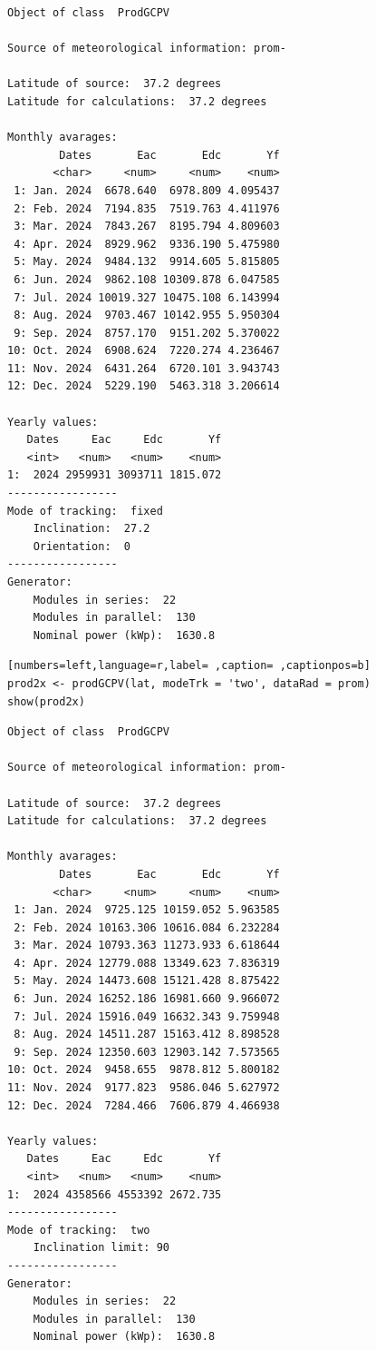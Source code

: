 \begin{verbatim}
Object of class  ProdGCPV 

Source of meteorological information: prom- 

Latitude of source:  37.2 degrees
Latitude for calculations:  37.2 degrees

Monthly avarages:
        Dates       Eac       Edc       Yf
       <char>     <num>     <num>    <num>
 1: Jan. 2024  6678.640  6978.809 4.095437
 2: Feb. 2024  7194.835  7519.763 4.411976
 3: Mar. 2024  7843.267  8195.794 4.809603
 4: Apr. 2024  8929.962  9336.190 5.475980
 5: May. 2024  9484.132  9914.605 5.815805
 6: Jun. 2024  9862.108 10309.878 6.047585
 7: Jul. 2024 10019.327 10475.108 6.143994
 8: Aug. 2024  9703.467 10142.955 5.950304
 9: Sep. 2024  8757.170  9151.202 5.370022
10: Oct. 2024  6908.624  7220.274 4.236467
11: Nov. 2024  6431.264  6720.101 3.943743
12: Dec. 2024  5229.190  5463.318 3.206614

Yearly values:
   Dates     Eac     Edc       Yf
   <int>   <num>   <num>    <num>
1:  2024 2959931 3093711 1815.072
-----------------
Mode of tracking:  fixed 
    Inclination:  27.2 
    Orientation:  0 
-----------------
Generator:
    Modules in series:  22 
    Modules in parallel:  130 
    Nominal power (kWp):  1630.8
\end{verbatim}

\begin{lstlisting}[numbers=left,language=r,label= ,caption= ,captionpos=b]
prod2x <- prodGCPV(lat, modeTrk = 'two', dataRad = prom)
show(prod2x)
\end{lstlisting}

\begin{verbatim}
Object of class  ProdGCPV 

Source of meteorological information: prom- 

Latitude of source:  37.2 degrees
Latitude for calculations:  37.2 degrees

Monthly avarages:
        Dates       Eac       Edc       Yf
       <char>     <num>     <num>    <num>
 1: Jan. 2024  9725.125 10159.052 5.963585
 2: Feb. 2024 10163.306 10616.084 6.232284
 3: Mar. 2024 10793.363 11273.933 6.618644
 4: Apr. 2024 12779.088 13349.623 7.836319
 5: May. 2024 14473.608 15121.428 8.875422
 6: Jun. 2024 16252.186 16981.660 9.966072
 7: Jul. 2024 15916.049 16632.343 9.759948
 8: Aug. 2024 14511.287 15163.412 8.898528
 9: Sep. 2024 12350.603 12903.142 7.573565
10: Oct. 2024  9458.655  9878.812 5.800182
11: Nov. 2024  9177.823  9586.046 5.627972
12: Dec. 2024  7284.466  7606.879 4.466938

Yearly values:
   Dates     Eac     Edc       Yf
   <int>   <num>   <num>    <num>
1:  2024 4358566 4553392 2672.735
-----------------
Mode of tracking:  two 
    Inclination limit: 90 
-----------------
Generator:
    Modules in series:  22 
    Modules in parallel:  130 
    Nominal power (kWp):  1630.8
\end{verbatim}

